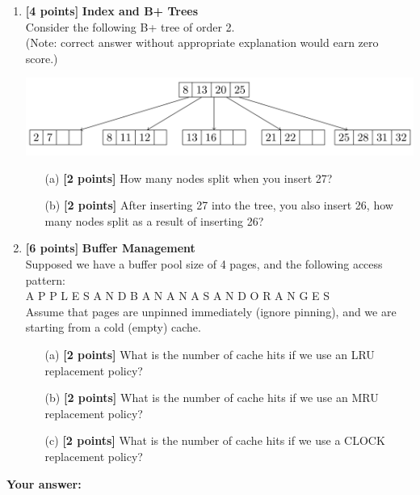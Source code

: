 \documentclass[10pt]{article}
\begin{document}
\begin{enumerate}


	\item \textbf{[4 points]} \textbf{Index and B+ Trees} \\
	      Consider the following B+ tree of order 2. \\
	      (Note: correct answer without appropriate explanation would earn zero score.)
	      \begin{center}
		      \includegraphics[scale=0.25]{Btree.png}
	      \end{center}
	      \begin{itemize}
		      \item[(a)] \textbf{[2 points]} How many nodes split when you insert 27? \\

		      \item[(b)] \textbf{[2 points]} After inserting 27 into the tree, you also insert 26, how many nodes split as a result of inserting 26? \\

	      \end{itemize}


	\item \textbf{[6 points]} \textbf{Buffer Management} \\
	      Supposed we have a buffer pool size of 4 pages, and the following access pattern: \\
	      A P P L E S A N D B A N A N A S A N D O R A N G E S \\
	      Assume that pages are unpinned immediately (ignore pinning), and we are starting from a cold (empty) cache.
	      \begin{itemize}
		      \item[(a)] \textbf{[2 points]} What is the number of cache hits if we
		            use an LRU replacement policy? \\

		      \item[(b)] \textbf{[2 points]} What is the number of cache hits if we
		            use an MRU replacement policy? \\

		      \item[(c)] \textbf{[2 points]} What is the number of cache hits if we
		            use a CLOCK replacement policy?  \\

	      \end{itemize}
\end{enumerate}
\textbf{Your answer:}
\end{document}
